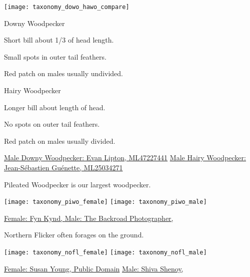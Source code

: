 \documentclass[t]{beamer}
\begin{document}
\begin{frame}

\texttt{[image: taxonomy\_dowo\_hawo\_compare]}

\vspace{-\baselineskip}

\begin{multicols}{2}

Downy Woodpecker

\medskip

Short bill about 1/3 of head length.

\smallskip

Small spots in outer tail feathers.

\smallskip

Red patch on males usually undivided.


\columnbreak

Hairy Woodpecker

\medskip

Longer bill about length of head.

\smallskip

No spots on outer tail feathers.

\smallskip

Red patch on males usually divided.

\end{multicols}


\vfilll

\tiny \href{https://macaulaylibrary.org/asset/47227441}{Male Downy Woodpecker: Evan Lipton, ML47227441} \hfill \href{https://macaulaylibrary.org/asset/25034271}{Male Hairy Woodpecker: Jean-Sébastien Guénette, ML25034271}

\end{frame}

\begin{frame}{Pileated Woodpecker is our largest woodpecker.}

\texttt{[image: taxonomy\_piwo\_female]}\hfill
\texttt{[image: taxonomy\_piwo\_male]}

\vfilll

\tiny \href{https://flickr.com/photos/79452129@N02/16950041431}{Female: Fyn Kynd, } \hfill \href{https://flickr.com/photos/thebackroadphotogragher/26201612377}{Male: The Backroad Photographer, }
\end{frame}

\begin{frame}{Northern Flicker often forages on the ground.}

\texttt{[image: taxonomy\_nofl\_female]}\hfill
\texttt{[image: taxonomy\_nofl\_male]}

\vfilll

\tiny \href{https://flickr.com/photos/95782365@N08/29975120108}{Female: Susan Young, Public Domain} \hfill \href{https://flickr.com/photos/shivashenoy/50804171637}{Male: Shiva Shenoy, }
\end{frame}
\end{document}
